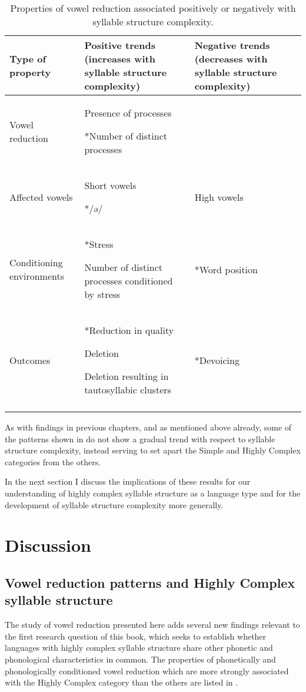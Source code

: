 \begin{table}
\begin{tabularx}{\textwidth}{XXX}
\lsptoprule

{Type of property} & Positive trends (increases with syllable structure complexity) & Negative trends (decreases with syllable structure complexity)\\\midrule
{Vowel reduction} & Presence of processes

*Number of distinct processes & \\
{Affected vowels} & Short vowels

*/ə/ & High vowels\\
{Conditioning environments} & *Stress

Number of distinct processes conditioned by stress & *Word position\\
{Outcomes} & *Reduction in quality

Deletion

Deletion resulting in tautosyllabic clusters & *Devoicing\\
\lspbottomrule
\end{tabularx}
\caption{\label{tab:6.10}Properties of vowel reduction associated positively or negatively with syllable structure complexity.}
\end{table}

  As with findings in previous chapters, and as mentioned above already, some of the patterns shown in  do not show a gradual trend with respect to syllable structure complexity, instead serving to set apart the Simple and Highly Complex categories from the others.

  In the next section I discuss the implications of these results for our understanding of highly complex syllable structure as a language type and for the development of syllable structure complexity more generally.

\section{Discussion}\label{sec:6.4}
\subsection{Vowel reduction patterns and Highly Complex syllable structure}\label{sec:6.4.1}

  The study of vowel reduction presented here adds several new findings relevant to the first research question of this book, which seeks to establish whether languages with highly complex syllable structure share other phonetic and phonological characteristics in common. The properties of phonetically and phonologically conditioned vowel reduction which are more strongly associated with the Highly Complex category than the others are listed in .

